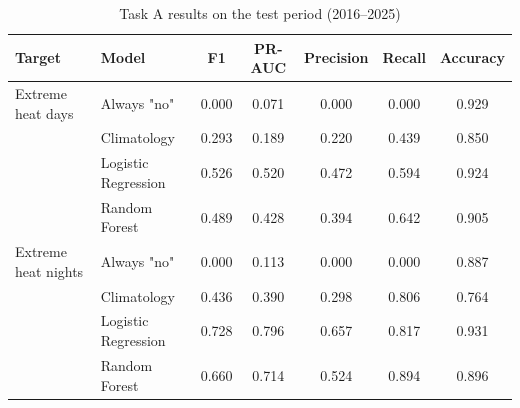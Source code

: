 \begin{table}[htbp]
\caption{Task A results on the test period (2016--2025)}
\label{tab:taskA}
\centering
\footnotesize
\begin{tabular}{|l|l|c|c|c|c|c|}
\hline
\textbf{Target} & \textbf{Model} & \textbf{F1} & \textbf{PR-AUC} & \textbf{Precision} & \textbf{Recall} & \textbf{Accuracy} \\
\hline
Extreme heat days & Always "no" & 0.000 & 0.071 & 0.000 & 0.000 & 0.929 \\
 & Climatology & 0.293 & 0.189 & 0.220 & 0.439 & 0.850 \\
 & Logistic Regression & 0.526 & 0.520 & 0.472 & 0.594 & 0.924 \\
 & Random Forest & 0.489 & 0.428 & 0.394 & 0.642 & 0.905 \\
\hline
Extreme heat nights & Always "no" & 0.000 & 0.113 & 0.000 & 0.000 & 0.887 \\
 & Climatology & 0.436 & 0.390 & 0.298 & 0.806 & 0.764 \\
 & Logistic Regression & 0.728 & 0.796 & 0.657 & 0.817 & 0.931 \\
 & Random Forest & 0.660 & 0.714 & 0.524 & 0.894 & 0.896 \\
\hline
\end{tabular}
\end{table}